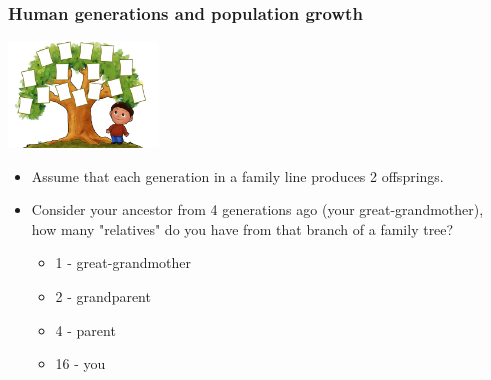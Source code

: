 \documentclass[notheorems
          ]
          {beamer}
\begin{document}
\begin{frame}
 \frametitle {  Human generations and population growth  }
 
 \hfill \includegraphics[width=0.3\textwidth]{img/family-tree.jpg}


 
 \begin{itemize}
  \item Assume that each generation in a family line produces 2 offsprings. 
  \item Consider your ancestor from 4 generations ago (your great-grandmother), how many "relatives" do you 
  have from that branch of a family tree? 
  \begin{itemize}
   \item 1 - great-grandmother
   \item 2 - grandparent 
   \item 4 - parent 
   \item 16 - you 
   
  \end{itemize}

 \end{itemize}

\end{frame}
\end{document}

